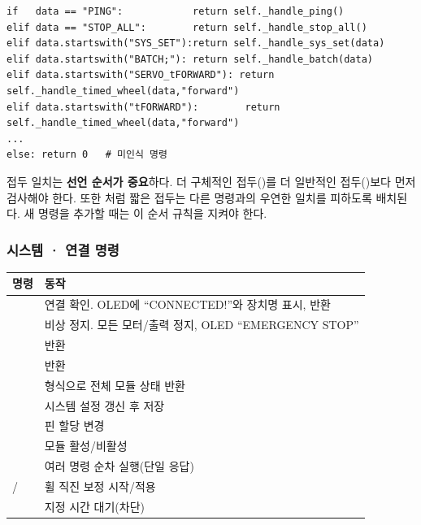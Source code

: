\begin{verbatim}
if   data == "PING":            return self._handle_ping()
elif data == "STOP_ALL":        return self._handle_stop_all()
elif data.startswith("SYS_SET"):return self._handle_sys_set(data)
elif data.startswith("BATCH;"): return self._handle_batch(data)
elif data.startswith("SERVO_tFORWARD"): return self._handle_timed_wheel(data,"forward")
elif data.startswith("tFORWARD"):        return self._handle_timed_wheel(data,"forward")
...
else: return 0   # 미인식 명령
\end{verbatim}

\begin{infobox}[title=접두 일치의 순서 의존성]
접두 일치는 \textbf{선언 순서가 중요}하다. 더 구체적인 접두()를
더 일반적인 접두()보다 먼저 검사해야 한다. 또한
처럼 짧은 접두는 다른 명령과의 우연한 일치를
피하도록 배치된다. 새 명령을 추가할 때는 이 순서 규칙을 지켜야 한다.
\end{infobox}

\subsubsection{시스템 \textbf{·} 연결 명령}

\begin{longtable}{L{3.4cm} L{11.0cm}}
\toprule
{}\textbf{명령} & \textbf{동작} \\
\midrule
\endhead
{} & 연결 확인. OLED에 ``CONNECTED!''와 장치명 표시,  반환 \\
 & 비상 정지. 모든 모터/출력 정지, OLED ``EMERGENCY STOP'' \\
 &  반환 \\
 &  반환 \\
 &  형식으로 전체 모듈 상태 반환 \\
 & 시스템 설정 갱신 후 저장 \\
 & 핀 할당 변경 \\
 & 모듈 활성/비활성 \\
 & 여러 명령 순차 실행(단일 응답) \\
 /  & 휠 직진 보정 시작/적용 \\
 & 지정 시간 대기(차단) \\
\bottomrule
\end{longtable}

